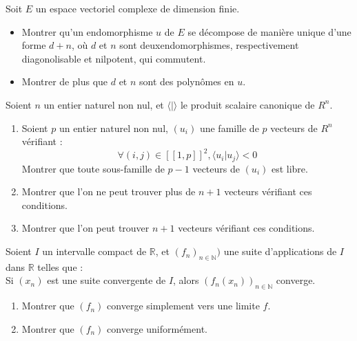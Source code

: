 \begin{exer}
Soit $E$ un espace vectoriel complexe de dimension finie.
\begin{itemize}
\item Montrer qu'un endomorphisme $u$ de $E$ se décompose de manière unique d'une forme $d+n$, %
où $d$ et $n$ sont deuxendomorphismes, respectivement diagonolisable et nilpotent, qui commutent.
\item Montrer de plus que $d$ et $n$ sont des polynômes en $u$.
\end{itemize}
\end{exer}

\begin{exer}
Soient $n$ un entier naturel non nul, et $\langle | \rangle$ le produit scalaire canonique de $R^n$.
\begin{enumerate}
\item Soient $p$ un entier naturel non nul, $(u_i)$ une famille de $p$ vecteurs de $R^n$ vérifiant :
\[\forall (i,j) \in [[1,p]]^2 , \langle u_i | u_j \rangle < 0\]
Montrer que toute sous-famille de $p-1$ vecteurs de $(u_i)$ est libre.
\item Montrer que l'on ne peut trouver plus de $n+1$ vecteurs vérifiant ces conditions.
\item Montrer que l'on  peut trouver $n+1$ vecteurs vérifiant ces conditions.
\end{enumerate}
\end{exer}

\begin{exer}
Soient $I$ un intervalle compact de $\mathbb{R}$, et $(f_n)_{n \in \mathbb{N}})$ %
une suite d'applications de $I$ dans $\mathbb{R}$ telles que :\\
Si $(x_n)$ est une suite convergente de $I$, alors $(f_n(x_n))_{n \in \mathbb{N}}$ converge.
\begin{enumerate}
\item Montrer que $(f_n)$ converge simplement vers une limite $f$.
\item Montrer que $(f_n)$ converge uniform\'ement.
\end{enumerate}
\end{exer}

